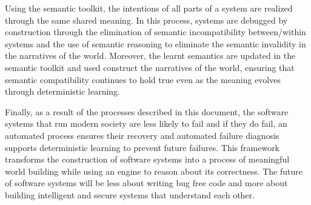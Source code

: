 Using the semantic toolkit, the intentions of all parts of a system are realized through the same shared meaning. In this process, systems are debugged by construction through the elimination of semantic incompatibility between/within systems and the use of semantic reasoning to eliminate the semantic invalidity in the narratives of the world. Moreover, the learnt semantics are updated in the semantic toolkit and used construct the narratives of the world, ensuring that semantic compatibility continues to hold true even as the meaning evolves through deterministic learning.

Finally, as a result of the processes described in this document, the software systems that run modern society are less likely to fail and if they do fail, an automated process ensures their recovery and automated failure diagnosis supports deterministic learning to prevent future failures. This framework transforms the construction of software systems into a process of meaningful world building while using an engine to reason about its correctness. The future of software systems will be less about writing bug free code and more about building intelligent and secure systems that understand each other. 